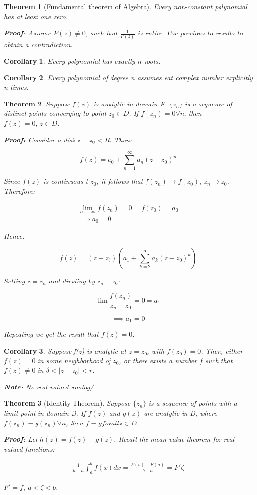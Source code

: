 \documentclass{article}
\newtheorem{theorem}{Theorem}[section]
\newtheorem{corollary}{Corollary}
\theoremstyle{definition}
\begin{document}
\begin{theorem}[Fundamental theorem of Algebra]
Every non-constant polynomial has at least one zero.

\textbf{Proof:}
Assume $P(z) \neq 0$, such that $\frac{1}{P(z)}$ is entire. Use previous to results to obtain a contradiction.
\end{theorem}
\begin{corollary}
Every polynomial has exactly $n$ roots.
\end{corollary}
\begin{corollary}
Every polynomial of degree n assumes eat complex number explicitly n times.
\end{corollary}
\begin{theorem}
Suppose $f(z)$ is analytic in domain F. $\{z_n\}$ is a sequence of distinct points converging to point $z_0 \in D$. If $f(z_n) = 0 \forall n$, then $f(z) = 0,\ z \in D$. 

\textbf{Proof:}
Consider a disk $z-z_0 < R$. Then:

$$f(z) = a_0 + \sum_{n=1}^\infty a_n (z-z_0)^n$$

Since $f(z)$ is continuous t $z_0$, it follows that $f(z_n) \to f(z_0),\ z_n \to z_0$. Therefore:

\begin{align*}
\lim_{n\to\infty}f(z_n) = 0 = f(z_0) = a_0\\
\implies a_0=0
\end{align*}

Hence:

$$f(z) = (z-z_0) \left(a_1 + \sum_{k=2}^\infty a_k (z-z_0)^k\right)$$

Setting $z = z_n$ and dividing by $z_n - z_0$:

$$\lim \frac{f(z_n)}{z_n-z_0} = 0 = a_1$$

$$\implies a_1 = 0$$

Repeating we get the result that $f(z) = 0$.
\end{theorem}

\begin{corollary}
Suppose f(z) is analytic at $z=z_0$, with $f(z_0) = 0$. Then, either $f(z) = 0$ in some neighborhood of $z_0$, or there exists a number $f$ such that $f(z) \neq 0$ in $\delta < |z-z_0| < r$. 

\textbf{Note:} No real-valued analog/
\end{corollary}
\begin{theorem}[Identity Theorem]
Suppose $\{z_n\}$ is a sequence of points with a limit point in domain D. If $f(z)$ and $g(z)$ are analytic in D, where $f(z_n) = g(z_n) \forall n$, then  $f=g forall z \in D$. 

\textbf{Proof:}
Let $h(z) = f(z) - g(z)$. Recall the mean value theorem for real valued functions:

\begin{align*}
\frac{1}{b-a} \int_{a}^{b} f(x) dx = \frac{F(b)-F(a)}{b-a} = F'{\zeta}
\end{align*}

$F' = f,\ a < \zeta < b$. 
\end{theorem}
\end{document}
